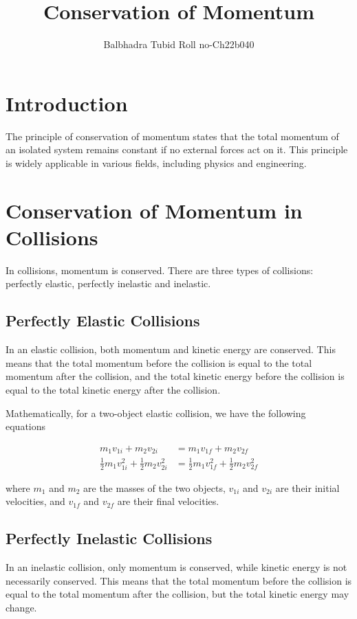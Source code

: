 \documentclass{article}
\title{Conservation of Momentum}
\author{Balbhadra Tubid   
Roll no-Ch22b040}
\begin{document}
\maketitle

\section{Introduction}
The principle of conservation of momentum states that the total momentum of an isolated system remains constant if no external forces act on it. This principle is widely applicable in various fields, including physics and engineering.

\section{Conservation of Momentum in Collisions}
In collisions, momentum is conserved. There are three types of collisions: perfectly elastic, perfectly inelastic and inelastic.


\subsection{Perfectly Elastic Collisions}
In an elastic collision, both momentum and kinetic energy are conserved. This means that the total momentum before the collision is equal to the total momentum after the collision, and the total kinetic energy before the collision is equal to the total kinetic energy after the collision.

Mathematically, for a two-object elastic collision, we have the following equations~\cite{arie}

\begin{align}
m_1 v_{1i} + m_2 v_{2i} &= m_1 v_{1f} + m_2 v_{2f} \\
\frac{1}{2} m_1 v_{1i}^2 + \frac{1}{2} m_2 v_{2i}^2 &= \frac{1}{2} m_1 v_{1f}^2 + \frac{1}{2} m_2 v_{2f}^2
\end{align}

where $m_1$ and $m_2$ are the masses of the two objects, $v_{1i}$ and $v_{2i}$ are their initial velocities, and $v_{1f}$ and $v_{2f}$ are their final velocities.

\subsection{Perfectly Inelastic Collisions}
In an inelastic collision, only momentum is conserved, while kinetic energy is not necessarily conserved. This means that the total momentum before the collision is equal to the total momentum after the collision, but the total kinetic energy may change.
\end{document}
